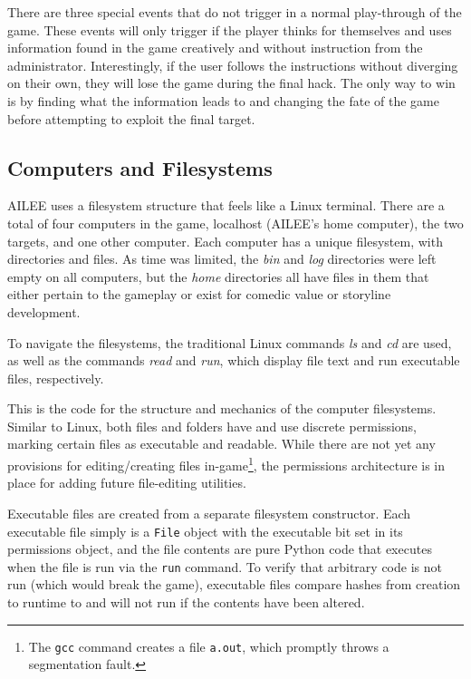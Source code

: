 \documentclass[conference]{IEEEtran}
\begin{document}
There are three special events that do not trigger in a normal play-through of the game. These events will only trigger if the player thinks for themselves and uses information found in the game creatively and without instruction from the administrator. Interestingly, if the user follows the instructions without diverging on their own, they will lose the game during the final hack. The only way to win is by finding what the information leads to and changing the fate of the game before attempting to exploit the final target.

\subsection{Computers and Filesystems}
AILEE uses a filesystem structure that feels like a Linux terminal. There are a total of four computers in the game, localhost (AILEE's home computer), the two targets, and one other computer. Each computer has a unique filesystem, with directories and files. As time was limited, the \textit{bin} and \textit{log} directories were left empty on all computers, but the \textit{home} directories all have files in them that either pertain to the gameplay or exist for comedic value or storyline development.

To navigate the filesystems, the traditional Linux commands \textit{ls} and \textit{cd} are used, as well as the commands \textit{read} and \textit{run}, which display file text and run executable files, respectively. 



This is the code for the structure and mechanics of the computer filesystems. 
Similar to Linux, both files and folders have and use discrete permissions, 
marking certain files as executable and readable.  While there are not yet any
provisions for editing/creating files in-game\footnote{The \texttt{gcc} command
creates a file \texttt{a.out}, which promptly throws a segmentation fault.},
the permissions architecture is in place for adding future file-editing
utilities.

Executable files are created from a separate filesystem constructor.  Each
executable file simply is a \texttt{File} object with the executable bit set in
its permissions object, and the file contents are pure Python code that executes
when the file is run via the \texttt{run} command.  To verify that arbitrary
code is not run (which would break the game), executable files compare hashes
from creation to runtime to and will not run if the contents have been
altered.
\end{document}
